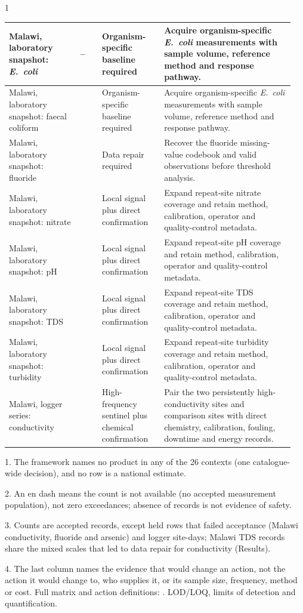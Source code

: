 \documentclass[10pt,letterpaper]{article}
\begin{document}
\begin{spacing}{1}
{\begin{longtable}{>{\raggedright\arraybackslash}p{0.2385\linewidth}>{\raggedleft\arraybackslash}p{0.0769\linewidth}>{\raggedright\arraybackslash}p{0.2077\linewidth}>{\raggedright\arraybackslash}p{0.4262\linewidth}}
Malawi, laboratory snapshot: \textit{E.~coli} & -- & Organism-specific baseline required & Acquire organism-specific \textit{E.~coli} measurements with sample volume, reference method and response pathway. \\ \hline
Malawi, laboratory snapshot: faecal coliform & 19 & Organism-specific baseline required & Acquire organism-specific \textit{E.~coli} measurements with sample volume, reference method and response pathway. \\ \hline
Malawi, laboratory snapshot: fluoride & 2 & Data repair required & Recover the fluoride missing-value codebook and valid observations before threshold analysis. \\ \hline
Malawi, laboratory snapshot: nitrate & 31 & Local signal plus direct confirmation & Expand repeat-site nitrate coverage and retain method, calibration, operator and quality-control metadata. \\ \hline
Malawi, laboratory snapshot: pH & 31 & Local signal plus direct confirmation & Expand repeat-site pH coverage and retain method, calibration, operator and quality-control metadata. \\ \hline
Malawi, laboratory snapshot: TDS & 31 & Local signal plus direct confirmation & Expand repeat-site TDS coverage and retain method, calibration, operator and quality-control metadata. \\ \hline
Malawi, laboratory snapshot: turbidity & 22 & Local signal plus direct confirmation & Expand repeat-site turbidity coverage and retain method, calibration, operator and quality-control metadata. \\ \hline
Malawi, logger series: conductivity & 714 & High-frequency sentinel plus chemical confirmation & Pair the two persistently high-conductivity sites and comparison sites with direct chemistry, calibration, fouling, downtime and energy records. \\ \hline
\end{longtable}
\begin{flushleft}
1. The framework names no product in any of the 26 contexts (one catalogue-wide decision), and no row is a national estimate.

2. An en dash means the count is not available (no accepted measurement population), not zero exceedances; absence of records is not evidence of safety.

3. Counts are accepted records, except held rows that failed acceptance (Malawi conductivity, fluoride and arsenic) and logger site-days; Malawi TDS records share the mixed scales that led to data repair for conductivity (Results).

4. The last column names the evidence that would change an action, not the action it would change to, who supplies it, or its sample size, frequency, method or cost. Full matrix and action definitions: . LOD/LOQ, limits of detection and quantification.
\end{flushleft}
}
\end{spacing}
\linenumbers
\end{document}

